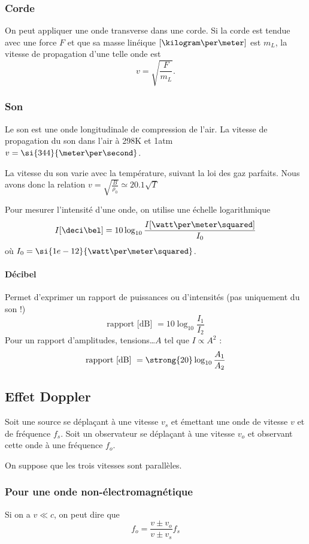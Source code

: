 \subsubsection{Corde}
On peut appliquer une onde transverse dans une corde.
Si la corde est tendue avec une force $F$ et que
sa masse linéique $[\kilogram\per\meter]$ est $m_L$,
la vitesse de propagation d'une telle onde est
\[ v = \sqrt{\frac{F}{m_L}}. \]

\subsubsection{Son}
Le son est une onde longitudinale de compression de l'air.
La vitesse de propagation du son dans l'air à \si{298}{K} et \si{1}{atm}
$v = \si{344}{\meter\per\second}$.

La vitesse du son varie avec la température, suivant la loi des gaz parfaits.
Nous avons donc la relation $v = \sqrt{\frac{B}{\rho_0}} \simeq 20.1\sqrt{T}$

Pour mesurer l'intensité d'une onde, on utilise une échelle logarithmique
\[ I[\deci\bel] = 10 \log_{10}\frac{I[\watt\per\meter\squared]}{I_0} \]
où $I_0 = \si{1e-12}{\watt\per\meter\squared}$.

\paragraph{Décibel}

Permet d'exprimer un rapport de puissances ou d'intensités
(pas uniquement du son !)
\[\text{rapport [dB] } = 10 \log_{10}\frac{I_1}{I_2}\]
Pour un rapport d'amplitudes, tensions\dots \(A\) tel que \(I \propto A^2\) :
\[\text{rapport [dB] } = \strong{20} \log_{10}\frac{A_1}{A_2}\]

\subsection{Effet Doppler}
Soit une source se déplaçant à une vitesse $v_s$ et émettant
une onde de vitesse $v$ et de fréquence $f_s$.
Soit un observateur se déplaçant à une vitesse $v_o$ et
observant cette onde à une fréquence $f_o$.

On suppose que les trois vitesses sont parallèles.

\subsubsection{Pour une onde non-électromagnétique}
Si on a $v \ll c$, on peut dire que
\[ f_o = \frac{v \pm v_o}{v \pm v_s} f_s \]

